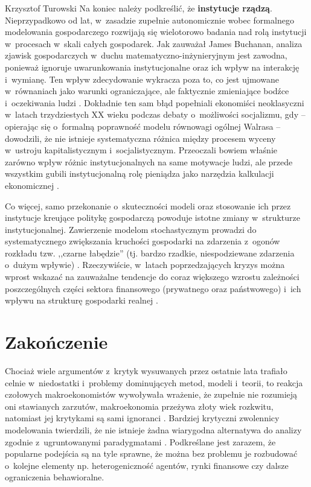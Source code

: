 \begin{artplenv}{Krzysztof Turowski}
Na koniec należy podkreślić, że \textbf{instytucje rządzą}. Nieprzypadkowo od lat, w~zasadzie zupełnie autonomicznie
wobec formalnego modelowania gospodarczego rozwijają się wielotorowo badania nad rolą instytucji w~procesach w~skali
całych gospodarek. Jak zauważał James Buchanan, analiza zjawisk gospodarczych w~duchu matematyczno-inżynieryjnym jest
zawodna, ponieważ ignoruje uwarunkowania instytucjonalne oraz ich wpływ na interakcję i~wymianę. Ten wpływ zdecydowanie
wykracza poza to, co jest ujmowane w~równaniach jako warunki ograniczające, ale faktycznie zmieniające
bodźce i~oczekiwania ludzi
\parencite{buchanan_economists_2009}.
Dokładnie ten sam błąd popełniali ekonomiści neoklasyczni
w~latach trzydziestych XX wieku podczas debaty o~możliwości socjalizmu, gdy  --  opierając się o~formalną
poprawność modelu równowagi ogólnej Walrasa  --  dowodzili, że nie istnieje systematyczna różnica między procesem
wyceny w~ustroju kapitalistycznym i~socjalistycznym. Przeoczali bowiem właśnie zarówno wpływ różnic instytucjonalnych
na same motywacje ludzi, ale przede wszystkim gubili instytucjonalną rolę pieniądza jako narzędzia kalkulacji
ekonomicznej
\parencite{mises_ludzkie_2007,mises_kalkulacja_2011}.

Co więcej, samo przekonanie o~skuteczności modeli oraz stosowanie ich przez instytucje kreujące politykę gospodarczą
powoduje istotne zmiany w~strukturze instytucjonalnej. Zawierzenie modelom stochastycznym prowadzi do systematycznego
zwiększania kruchości gospodarki na zdarzenia z~ogonów rozkładu tzw. ,,czarne łabędzie'' (tj. bardzo rzadkie,
niespodziewane zdarzenia o~dużym wpływie)
\parencite{taleb_antykruchosc:_2013}.
Rzeczywiście, w~latach poprzedzających
kryzys można wprost wskazać na zauważalne tendencje do coraz większego wzrostu zależności poszczególnych części
sektora finansowego (prywatnego oraz państwowego) i~ich wpływu na strukturę gospodarki realnej
\parencite{jablecki_financial_2016}.

\section*{Zakończenie}
Chociaż wiele argumentów z~krytyk wysuwanych przez ostatnie lata trafiało celnie w~niedostatki i~problemy dominujących
metod, modeli i~teorii, to reakcja czołowych makroekonomistów wywoływała wrażenie, że zupełnie nie rozumieją oni
stawianych zarzutów, makroekonomia przeżywa złoty wiek rozkwitu, natomiast jej krytykami są sami ignoranci
\parencite{lucas_defence_2009,sargent_interview_2010}.
Bardziej krytyczni zwolennicy modelowania twierdzili, że nie
istnieje żadna wiarygodna alternatywa do analizy zgodnie z~ugruntowanymi paradygmatami
\parencite{blanchard_tienen_2016,korinek_thoughts_2017}.
Podkreślane jest zarazem, że popularne podejścia są na tyle
sprawne, że można bez problemu je rozbudować o~kolejne elementy np. heterogeniczność agentów, rynki finansowe czy
dalsze ograniczenia behawioralne.


\end{artplenv}
